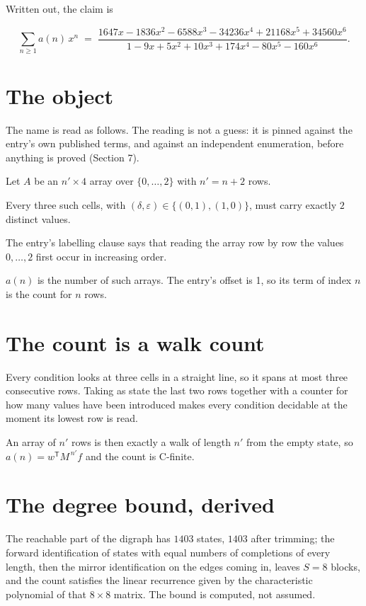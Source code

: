 \documentclass[11pt]{article}
\theoremstyle{definition}
\begin{document}
Written out, the claim is

\[\sum_{n \ge 1} a(n)\,x^n \;=\; \frac{1647x - 1836x^{2} - 6588x^{3} - 34236x^{4} + 21168x^{5} + 34560x^{6}}{1 - 9x + 5x^{2} + 10x^{3} + 174x^{4} - 80x^{5} - 160x^{6}}.\]

\section{The object}

The name is read as follows. The reading is not a guess: it is pinned against the entry's own published terms, and against an independent enumeration, before anything is proved (Section 7).

Let $A$ be an $n' \times 4$ array over $\{0,\dots,2\}$ with $n' = n + 2$ rows.

Every three such cells, with $(\delta,\varepsilon) \in \{(0,1), (1,0)\}$, must carry exactly $2$ distinct values.

The entry's labelling clause says that reading the array row by row the values $0,\dots,2$ first occur in increasing order.

$a(n)$ is the number of such arrays. The entry's offset is 1, so its term of index $n$ is the count for $n$ rows.

\section{The count is a walk count}

Every condition looks at three cells in a straight line, so it spans at most three consecutive rows. Taking as state the last two rows together with a counter for how many values have been introduced makes every condition decidable at the moment its lowest row is read.

An array of $n'$ rows is then exactly a walk of length $n'$ from the empty state, so $a(n) = w^{\mathsf T}M^{\,n'}f$ and the count is C-finite.

\section{The degree bound, derived}

The reachable part of the digraph has $1403$ states, $1403$ after trimming; the forward identification of states with equal numbers of completions of every length, then the mirror identification on the edges coming in, leaves $S = 8$ blocks, and the count satisfies the linear recurrence given by the characteristic polynomial of that $8\times8$ matrix. The bound is computed, not assumed.
\end{document}
